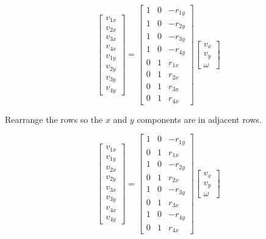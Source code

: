 \begin{equation*}
  \begin{bmatrix}
    v_{1x} \\
    v_{2x} \\
    v_{3x} \\
    v_{4x} \\
    v_{1y} \\
    v_{2y} \\
    v_{3y} \\
    v_{4y}
  \end{bmatrix} =
  \begin{bmatrix}
    1 & 0 & -r_{1y} \\
    1 & 0 & -r_{2y} \\
    1 & 0 & -r_{3y} \\
    1 & 0 & -r_{4y} \\
    0 & 1 &  r_{1x} \\
    0 & 1 &  r_{2x} \\
    0 & 1 &  r_{3x} \\
    0 & 1 &  r_{4x}
  \end{bmatrix}
  \begin{bmatrix}
    v_x \\
    v_y \\
    \omega
  \end{bmatrix}
\end{equation*}

Rearrange the rows so the $x$ and $y$ components are in adjacent rows.

\begin{equation}
  \begin{bmatrix}
    v_{1x} \\
    v_{1y} \\
    v_{2x} \\
    v_{2y} \\
    v_{3x} \\
    v_{3y} \\
    v_{4x} \\
    v_{4y}
  \end{bmatrix} =
  \begin{bmatrix}
    1 & 0 & -r_{1y} \\
    0 & 1 &  r_{1x} \\
    1 & 0 & -r_{2y} \\
    0 & 1 &  r_{2x} \\
    1 & 0 & -r_{3y} \\
    0 & 1 &  r_{3x} \\
    1 & 0 & -r_{4y} \\
    0 & 1 &  r_{4x}
  \end{bmatrix}
  \begin{bmatrix}
    v_x \\
    v_y \\
    \omega
  \end{bmatrix}
\end{equation}

